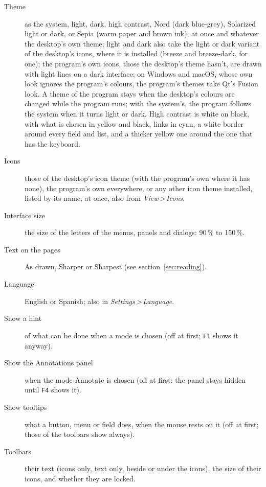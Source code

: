 \documentclass[12pt,
              article,
              oneside
              ]{memoir}
\newcommand*{\menu}[1]{\textit{#1}}
\newcommand*{\then}{\,>\,}
\newcommand*{\key}[1]{\texttt{#1}}
\begin{document}
%
\begin{description}
\item[Theme] as the system, light, dark, high contrast, Nord (dark blue-grey), Solarized light or dark, or Sepia (warm paper and brown ink), at once and whatever the desktop's own theme; light and dark also take the light or dark variant of the desktop's icons, where it is installed (breeze and breeze-dark, for one); the program's own icons, those the desktop's theme hasn't, are drawn with light lines on a dark interface; on Windows and macOS, whose own look ignores the program's colours, the program's themes take Qt's Fusion look. A theme of the program stays when the desktop's colours are changed while the program runs; with the system's, the program follows the system when it turns light or dark. High contrast is white on black, with what is chosen in yellow and black, links in cyan, a white border around every field and list, and a thicker yellow one around the one that has the keyboard.
\item[Icons] those of the desktop's icon theme (with the program's own where it has none), the program's own everywhere, or any other icon theme installed, listed by its name; at once, also from \menu{View\then Icons}.
\item[Interface size] the size of the letters of the menus,
  panels and dialogs: 90\,\% to 150\,\%.
\item[Text on the pages] As drawn, Sharper or Sharpest (see
  section~\ref{sec:reading}).
\item[Language] English or Spanish; also in \menu{Settings\then Language}.
\item[Show a hint] of what can be done when a mode is chosen (off at
  first; \key{F1} shows it anyway).
\item[Show the Annotations panel] when the mode Annotate is chosen (off
  at first: the panel stays hidden until \key{F4} shows it).
\item[Show tooltips] what a button, menu or field does, when the mouse
  rests on it (off at first; those of the toolbars show always).
\item[Toolbars] their text (icons only, text only, beside or under the
  icons), the size of their icons, and whether they are locked.
\end{description}
\end{document}
